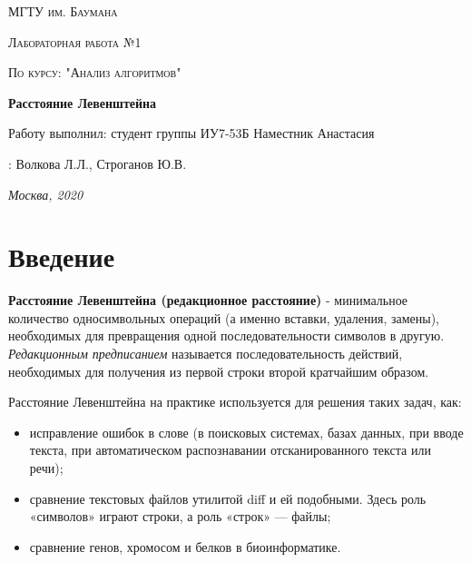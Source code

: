 \documentclass[12pt]{report}
\begin{document}
 
\begin{titlepage}
	\centering
	{\scshape\LARGE МГТУ им. Баумана \par}
	\vspace{3cm}
	{\scshape\Large Лабораторная работа №1\par}
	\vspace{0.5cm}	
	{\scshape\Large По курсу: "Анализ алгоритмов"\par}
	\vspace{1.5cm}
	{\huge\bfseries Расстояние Левенштейна\par}
	\vspace{2cm}
	\Large Работу выполнил: студент группы ИУ7-53Б Наместник Анастасия\par
	\vspace{0.5cm}
	:  Волкова Л.Л., Строганов Ю.В.\par

	\vfill
	\large \textit {Москва, 2020} \par
\end{titlepage}

\tableofcontents

\newpage
\chapter*{Введение}

\textbf{            Расстояние Левенштейна (редакционное расстояние)} -  минимальное количество односимвольных операций (а именно вставки, удаления, замены), необходимых для превращения одной последовательности символов в другую.\\

\textit{Редакционным предписанием} называется последовательность действий, необходимых для получения из первой строки второй кратчайшим образом.

Расстояние Левенштейна на практике используется для решения таких задач, как:

\begin{itemize}
	\item  исправление ошибок в слове (в поисковых системах, базах данных, при вводе текста, при автоматическом распознавании отсканированного текста или речи);
	\item сравнение текстовых файлов утилитой diff и ей подобными. Здесь роль «символов» играют строки, а роль «строк» — файлы;
	\item сравнение генов, хромосом и белков  в биоинформатике.
\end{itemize}
\end{document}
